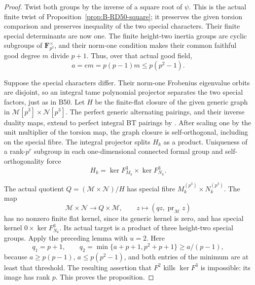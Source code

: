 \begin{proof}
Twist both groups by the inverse of a square root of \(\psi\).
This is the actual finite twist of
Proposition~\ref{prop:B-RD50-square}; it preserves the given
torsion comparison and preserves inequality of the two special
characters. Their finite special determinants are now one.
The finite height-two inertia groups are cyclic subgroups of
\(\mathbf F_{p^2}^{\times}\), and their norm-one condition
makes their common faithful good degree \(m\) divide \(p+1\).
Thus, over that actual good field,
\[
             a=em=p(p-1)m\le p(p^2-1).               \tag{B-RD77.5}
\]

Suppose the special characters differ. Their norm-one
Frobenius eigenvalue orbits are disjoint, so an integral tame
polynomial projector separates the two special factors, just
as in B50. Let \(H\) be the finite-flat closure of the given
generic graph in \(\mathcal M[p^3]\times\mathcal N[p^3]\).
The perfect generic alternating pairings, and their inverse
duality maps, extend to perfect integral BT pairings by
\cite[Theorem~4 and Corollaries~1--2, p.~181]{Tate1967PDivisible}.
After scaling one by the unit multiplier of the torsion map,
the graph closure is self-orthogonal, including on the special
fibre. The integral projector splits \(H_k\) as a product.
Uniqueness of a rank-\(p^r\) subgroup in each one-dimensional
connected formal group and self-orthogonality force
\[
            H_k=\ker F_{M_k}^{3}\times\ker F_{N_k}^{3}.
                                                        \tag{B-RD77.6}
\]

The actual quotient \(Q=(\mathcal M\times\mathcal N)/H\)
has special fibre \(M_k^{(p^3)}\times N_k^{(p^3)}\).
The map
\[
 \mathcal M\times\mathcal N\longrightarrow Q\times\mathcal M,
 \qquad z\longmapsto(qz,\operatorname{pr}_{\mathcal M}z)
                                                        \tag{B-RD77.7}
\]
has no nonzero finite flat kernel, since its generic kernel is
zero, and has special kernel \(0\times\ker F_{N_k}^{3}\).
Its actual target is a product of three height-two special
groups. Apply the preceding lemma with \(u=2\). Here
\[
 q_1=p+1,\qquad
 q_2=\min\{a+p+1,p^2+p+1\}\ge a/(p-1),              \tag{B-RD77.8}
\]
because \(a\ge p(p-1)\), \(a\le p(p^2-1)\), and both
entries of the minimum are at least that threshold. The
resulting assertion that \(F^2\) kills \(\ker F^3\) is
impossible: its image has rank \(p\). This proves the proposition.
\end{proof}

